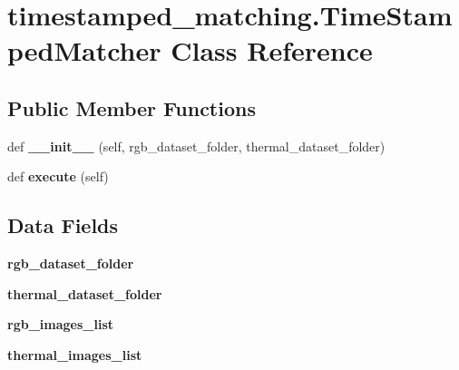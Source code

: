 \hypertarget{classtimestamped__matching_1_1TimeStampedMatcher}{}\section{timestamped\+\_\+matching.\+Time\+Stamped\+Matcher Class Reference}
\label{classtimestamped__matching_1_1TimeStampedMatcher}
\subsection*{Public Member Functions}
\begin{DoxyCompactItemize}
\item 
\mbox{\label{classtimestamped__matching_1_1TimeStampedMatcher_a0890ce5e8c5883bc693663d34b4c3bba}} 
def {\bfseries \+\_\+\+\_\+init\+\_\+\+\_\+} (self, rgb\+\_\+dataset\+\_\+folder, thermal\+\_\+dataset\+\_\+folder)
\item 
\mbox{\label{classtimestamped__matching_1_1TimeStampedMatcher_a07c020268cf85ecc2e009d4909db8775}} 
def {\bfseries execute} (self)
\end{DoxyCompactItemize}
\subsection*{Data Fields}
\begin{DoxyCompactItemize}
\item 
\mbox{\label{classtimestamped__matching_1_1TimeStampedMatcher_a624e2f29ebb4ab0f29f75f860b3c96cd}} 
{\bfseries rgb\+\_\+dataset\+\_\+folder}
\item 
\mbox{\label{classtimestamped__matching_1_1TimeStampedMatcher_ae7ca1fb58168bd718f95f56122b9c6d2}} 
{\bfseries thermal\+\_\+dataset\+\_\+folder}
\item 
\mbox{\label{classtimestamped__matching_1_1TimeStampedMatcher_a0967ffeb31769ea606266e8946822a42}} 
{\bfseries rgb\+\_\+images\+\_\+list}
\item 
\mbox{\label{classtimestamped__matching_1_1TimeStampedMatcher_a6f4a77e137dec267322df1707f9e5e8e}} 
{\bfseries thermal\+\_\+images\+\_\+list}
\end{DoxyCompactItemize}


